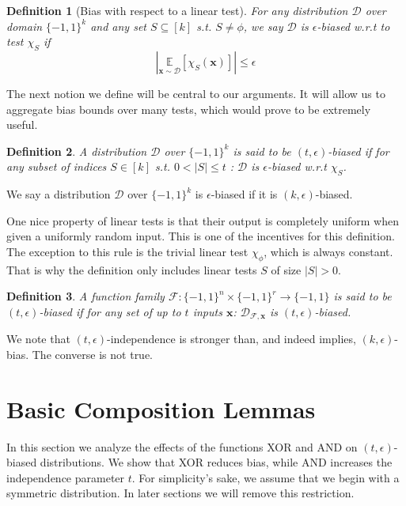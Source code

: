 \documentclass[12pt]{article}
\newtheorem{definition}{Definition}[section]
\newcommand{\oo}[1]{\{-1,1\}^{#1}}
\newcommand{\dist}{\mathcal{D}}
\newcommand{\E}{\mathbb{E}}
\newcommand{\F}{\mathcal{F}}
\newcommand{\abs}[1]{\left| #1 \right|}
\renewcommand{\vec}[1]{\bm{#1}}
\begin{document}
	\begin{definition}[Bias with respect to a linear test] \label{Def: bias w.r.t linear test}
		For any distribution $\dist$ over domain $\oo{k}$ and any set $S \subseteq \left[k\right]$ s.t. $S \neq \phi$, we say $\dist$ is \emph{ $\epsilon$-biased w.r.t to test $\chi_S$} if
		\begin{equation*}
		\abs{\underset{\vec{x} \sim \dist}{\E} \left[ \chi_S(\vec{x}) \right]} \leq \epsilon
		\end{equation*}
	\end{definition}
	
	The next notion we define will be central to our arguments.
	It will allow us to aggregate bias bounds over many tests, which would prove to be extremely useful.
	
	\begin{definition} \label{t epsilon bias}
		A distribution $\dist$ over $\oo{k}$ is said to be \emph{$(t,\epsilon)$-biased} if for any subset of indices $S \in \left[k\right]$ s.t. $0 < \abs{S} \leq t$ : $\dist$ is $\epsilon$-biased w.r.t $\chi_S$.
	\end{definition}
	We say a distribution $\dist$ over $\oo{k}$ is $\epsilon$-biased if it is $(k, \epsilon)$-biased.
	
	One nice property of linear tests is that their output is completely uniform when given a uniformly random input.
	This is one of the incentives for this definition.
	The exception to this rule is the trivial linear test $\chi_\phi$, which is always constant.
	That is why the definition only includes linear tests $S$ of size $\abs{S} > 0$.
	
	
	\begin{definition} \label{definition: function family t-bias}
		A function family $\F : \oo{n} \times \oo{r} \rightarrow \{-1,1\}$ is said to be \emph{$(t, \epsilon)$-biased} if for any set of up to $t$ inputs $\vec{x}$: $\dist_{\F,\vec{x}}$ is $(t,\epsilon)$-biased.
	\end{definition}
	
	We note that $(t,\epsilon)$-independence is stronger than, and indeed implies, $(k, \epsilon)$-bias.
	The converse is not true.

\section{Basic Composition Lemmas} \label{section: composition lemmas}
	
	In this section we analyze the effects of the functions XOR and AND on $(t,\epsilon)$-biased distributions.
	We show that XOR reduces bias, while AND increases the independence parameter $t$.
	For simplicity's sake, we assume that we begin with a symmetric distribution.
	In later sections we will remove this restriction.
	
\end{document}
